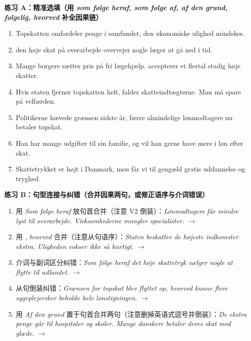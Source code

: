 \textbf{练习 A：精准选填（用 \textit{som følge heraf, som følge af, af den grund, følgelig, hvorved} 补全因果链）}
\begin{enumerate}
  \item Topskatten omfordeler penge i samfundet, \underline{\hspace{2.2cm}} den økonomiske ulighed mindskes.
  \item \underline{\hspace{2.2cm}} den høje skat på overarbejde overvejer nogle læger at gå ned i tid.
  \item Mange borgere sætter pris på fri lægehjælp. \underline{\hspace{2.2cm}} accepterer et flertal stadig høje skatter.
  \item Hvis staten fjerner topskatten helt, falder skatteindtægterne. Man må \underline{\hspace{2.2cm}} spare på velfærden.
  \item Politikerne hævede grænsen sidste år, \underline{\hspace{2.2cm}} færre almindelige lønmodtagere nu betaler topskat.
  \item Han har mange udgifter til sin familie, og \underline{\hspace{2.2cm}} vil han gerne have mere i løn efter skat.
  \item Skattetrykket er højt i Danmark, men \underline{\hspace{2.2cm}} får vi til gengæld gratis uddannelse og tryghed.
\end{enumerate}

\textbf{练习 B：句型连接与纠错（合并因果两句，或修正语序与介词错误）}
\begin{enumerate}
  \item 用 \textit{Som følge heraf} 放句首合并（注意 V2 倒装）：\textit{Lønmodtagere får mindre lyst til overarbejde. Virksomhederne mangler specialister.} $\rightarrow$
  \item 用 \textit{, hvorved} 合并（注意从句语序）：\textit{Staten beskatter de højeste indkomster ekstra. Uligheden vokser ikke så hurtigt.} $\rightarrow$
  \item 介词与副词区分纠错：\textit{Som følge heraf det høje skattetryk vælger nogle at flytte til udlandet.} $\rightarrow$
  \item 从句倒装纠错：\textit{Grænsen for topskat blev flyttet op, hvorved kunne flere sygeplejersker beholde hele lønstigningen.} $\rightarrow$
  \item 用 \textit{Af den grund} 置于句首合并两句（注意删掉英语式逗号并倒装）：\textit{De ekstra penge går til hospitaler og skoler. Mange danskere betaler deres skat med glæde.} $\rightarrow$
\end{enumerate}

